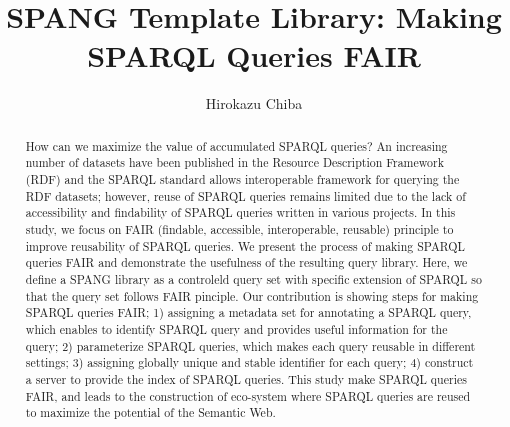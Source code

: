 \documentclass[runningheads]{llncs}
\begin{document}
\title{SPANG Template Library: Making SPARQL Queries FAIR}
\author{Hirokazu Chiba}
%
\maketitle              %
%
\begin{abstract}
How can we maximize the value of accumulated SPARQL queries? 
An increasing number of datasets have been published in the Resource Description Framework (RDF) and the SPARQL standard allows interoperable framework for querying the RDF datasets; however, reuse of SPARQL queries remains limited due to the lack of accessibility and findability of SPARQL queries written in various projects. 
In this study, we focus on FAIR (findable, accessible, interoperable,
reusable) principle to improve reusability of SPARQL queries.
We present the process of making SPARQL queries FAIR and demonstrate the usefulness of the resulting query library.
Here, we define a SPANG library as a controleld query set with specific
extension of SPARQL so that the query set follows FAIR pinciple.
Our contribution is showing steps for making SPARQL queries FAIR;
1) assigning a metadata set for annotating a SPARQL query, which
enables to identify SPARQL query and provides useful information for the query;
2) parameterize SPARQL queries, which makes each query reusable in different settings;
3) assigning globally unique and stable identifier for each query;
4) construct a server to provide the index of SPARQL queries.
This study make SPARQL queries FAIR, and leads to the construction of eco-system where SPARQL queries are reused to maximize the potential of the Semantic Web.


\end{abstract}
\end{document}
